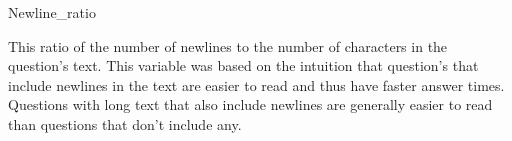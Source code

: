 \documentclass{article}
\begin{document}
Newline\_ratio

This ratio of the number of newlines to the number of characters in the question's text. This variable was based on the intuition that question's that include newlines in the text are easier to read and thus have faster answer times. Questions with long text that also include newlines are generally easier to read than questions that don’t include any. 



\end{document}

